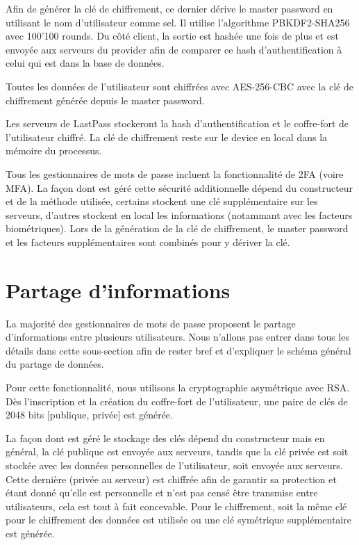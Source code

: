 Afin de générer la clé de chiffrement, ce dernier dérive le master password en utilisant le nom d'utilisateur comme sel. Il utilise l'algorithme PBKDF2-SHA256 avec 100'100 rounds. Du côté client, la sortie est hashée une fois de plus et est envoyée aux serveurs du provider afin de comparer ce hash d'authentification à celui qui est dans la base de données.

Toutes les données de l'utilisateur sont chiffrées avec AES-256-CBC avec la clé de chiffrement générée depuis le master password.

Les serveurs de LastPass stockeront la hash d'authentification et le coffre-fort de l'utilisateur chiffré. La clé de chiffrement reste sur le device en local dans la mémoire du processus.

Tous les gestionnaires de mots de passe incluent la fonctionnalité de 2FA (voire MFA). La façon dont est géré cette sécurité additionnelle dépend du constructeur et de la méthode utilisée, certains stockent une clé supplémentaire sur les serveurs, d'autres stockent en local les informations (notammant avec les facteurs biométriques). Lors de la génération de la clé de chiffrement, le master password et les facteurs supplémentaires sont combinés pour y dériver la clé.
\section{Partage d'informations}
La majorité des gestionnaires de mots de passe proposent le partage d'informations entre plusieurs utilisateurs. Nous n'allons pas entrer dans tous les détails dans cette sous-section afin de rester bref et d'expliquer le schéma général du partage de données.

Pour cette fonctionnalité, nous utilisons la cryptographie asymétrique avec RSA. Dès l'inscription et la création du coffre-fort de l'utilisateur, une paire de clés de 2048 bits [publique, privée] est générée. 

La façon dont est géré le stockage des clés dépend du constructeur mais en général, la clé publique est envoyée aux serveurs, tandis que la clé privée est soit stockée avec les données personnelles de l'utilisateur, soit envoyée aux serveurs. Cette dernière (privée au serveur) est chiffrée afin de garantir sa protection et étant donné qu'elle est personnelle et n'est pas censé être transmise entre utilisateurs, cela est tout à fait concevable. Pour le chiffrement, soit la même clé pour le chiffrement des données est utilisée ou une clé symétrique supplémentaire est générée. 

